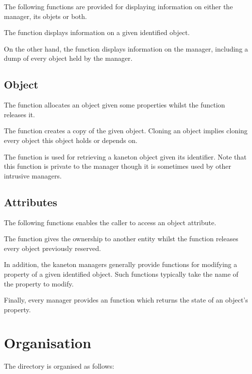 The following functions are provided for displaying information on either
the manager, its objets or both.

The function  displays information on a given identified object.

On the other hand, the  function displays information on the
manager, including a dump of every object held by the manager.


\subsection*{Object}

The function  allocates an object given some properties
whilst the  function releases it.

The function  creates a copy of the given object. Cloning an
object implies cloning every object this object holds or depends on.

The  function is used for retrieving a kaneton object given its
identifier. Note that this function is private to the manager though it is
sometimes used by other intrusive managers.


\subsection*{Attributes}

The following functions enables the caller to access an object attribute.

The function  gives the ownership to another entity whilst
the function  releases every object previously reserved.

In addition, the kaneton managers generally provide functions for modifying
a property of a given identified object. Such functions typically take the
name of the property to modify.

Finally, every manager provides an  function which
returns the state of an object's property.

%
%

\section{Organisation}

The  directory is organised as follows:

